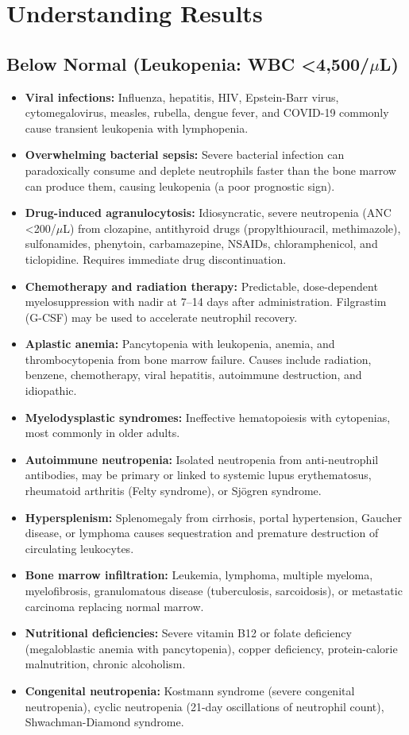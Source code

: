 \section*{Understanding Results}

\subsection*{Below Normal (Leukopenia: WBC <4,500/$\mu$L)}
\begin{itemize}
  \item \textbf{Viral infections:} Influenza, hepatitis, HIV, Epstein-Barr virus, cytomegalovirus, measles, rubella, dengue fever, and COVID-19 commonly cause transient leukopenia with lymphopenia.
  \item \textbf{Overwhelming bacterial sepsis:} Severe bacterial infection can paradoxically consume and deplete neutrophils faster than the bone marrow can produce them, causing leukopenia (a poor prognostic sign).
  \item \textbf{Drug-induced agranulocytosis:} Idiosyncratic, severe neutropenia (ANC <200/$\mu$L) from clozapine, antithyroid drugs (propylthiouracil, methimazole), sulfonamides, phenytoin, carbamazepine, NSAIDs, chloramphenicol, and ticlopidine. Requires immediate drug discontinuation.
  \item \textbf{Chemotherapy and radiation therapy:} Predictable, dose-dependent myelosuppression with nadir at 7--14 days after administration. Filgrastim (G-CSF) may be used to accelerate neutrophil recovery.
  \item \textbf{Aplastic anemia:} Pancytopenia with leukopenia, anemia, and thrombocytopenia from bone marrow failure. Causes include radiation, benzene, chemotherapy, viral hepatitis, autoimmune destruction, and idiopathic.
  \item \textbf{Myelodysplastic syndromes:} Ineffective hematopoiesis with cytopenias, most commonly in older adults.
  \item \textbf{Autoimmune neutropenia:} Isolated neutropenia from anti-neutrophil antibodies, may be primary or linked to systemic lupus erythematosus, rheumatoid arthritis (Felty syndrome), or Sj\"{o}gren syndrome.
  \item \textbf{Hypersplenism:} Splenomegaly from cirrhosis, portal hypertension, Gaucher disease, or lymphoma causes sequestration and premature destruction of circulating leukocytes.
  \item \textbf{Bone marrow infiltration:} Leukemia, lymphoma, multiple myeloma, myelofibrosis, granulomatous disease (tuberculosis, sarcoidosis), or metastatic carcinoma replacing normal marrow.
  \item \textbf{Nutritional deficiencies:} Severe vitamin B12 or folate deficiency (megaloblastic anemia with pancytopenia), copper deficiency, protein-calorie malnutrition, chronic alcoholism.
  \item \textbf{Congenital neutropenia:} Kostmann syndrome (severe congenital neutropenia), cyclic neutropenia (21-day oscillations of neutrophil count), Shwachman-Diamond syndrome.
\end{itemize}

